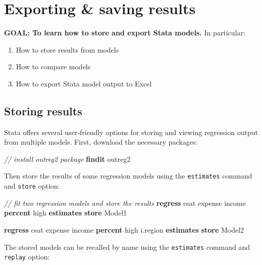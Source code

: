 \documentclass[
]{book}
\newenvironment{Shaded}{\begin{snugshade}}{\end{snugshade}}
\newcommand{\CommentTok}[1]{\textcolor[rgb]{0.56,0.35,0.01}{\textit{#1}}}
\newcommand{\KeywordTok}[1]{\textcolor[rgb]{0.13,0.29,0.53}{\textbf{#1}}}
\newcommand{\NormalTok}[1]{#1}
\providecommand{\tightlist}{%
  \setlength{\itemsep}{0pt}\setlength{\parskip}{0pt}}
\begin{document}
\hypertarget{exporting-saving-results}{%
\section{Exporting \& saving results}\label{exporting-saving-results}}

\textbf{GOAL: To learn how to store and export Stata models.} In particular:

\begin{enumerate}
\def\labelenumi{\arabic{enumi}.}
\tightlist
\item
  How to store results from models
\item
  How to compare models
\item
  How to export Stata model output to Excel
\end{enumerate}

\hypertarget{storing-results}{%
\subsection{Storing results}\label{storing-results}}

Stata offers several user-friendly options for storing and viewing regression output from multiple models. First, download the necessary packages:

\begin{Shaded}
\begin{Highlighting}[]
\CommentTok{// install outreg2 package}
\KeywordTok{findit}\NormalTok{ outreg2}
\end{Highlighting}
\end{Shaded}

Then store the results of some regression models using the \texttt{estimates} command and \texttt{store} option:

\begin{Shaded}
\begin{Highlighting}[]
\CommentTok{// fit two regression models and store the results}
\KeywordTok{regress}\NormalTok{ csat expense income }\KeywordTok{percent}\NormalTok{ high}
\KeywordTok{estimates} \KeywordTok{store}\NormalTok{ Model1}
  
\KeywordTok{regress}\NormalTok{ csat expense income }\KeywordTok{percent}\NormalTok{ high i.region}
\KeywordTok{estimates} \KeywordTok{store}\NormalTok{ Model2}
\end{Highlighting}
\end{Shaded}

The stored models can be recalled by name using the \texttt{estimates} command and \texttt{replay} option:
\end{document}
